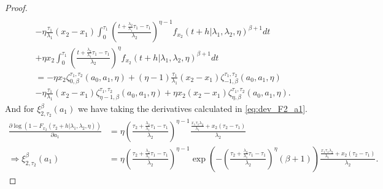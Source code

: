 \documentclass{article}
\begin{document}
\begin{proof}
\begin{align*}
\\
&-\eta\frac{\tau_1}{\lambda_1}(x_2-x_1)\int_{0}^{\tau_1}\left(\frac{t+\frac{\lambda_2}{\lambda_1}\tau_1-\tau_1}{\lambda_2}\right)^{\eta-1}f_{x_2}(t+h|\lambda_1,\lambda_2,\eta)^{\beta+1}dt 
\\
&+\eta x_2 \int_{0}^{\tau_1}\left(\frac{t+\frac{\lambda_2}{\lambda_1}\tau_1-\tau_1}{\lambda_2}\right)^{\eta}f_{x_2}(t+h|\lambda_1,\lambda_2,\eta)^{\beta+1}dt 
\\
&=-\eta x_2 \zeta_{0,\beta}^{\tau_1,\tau_2}(a_0,a_1,\eta)+(\eta-1)\frac{\tau_1}{\lambda_1}(x_2-x_1)\zeta_{-1,\beta}^{\tau_1,\tau_2}(a_0,a_1,\eta)
\\
&-\eta\frac{\tau_1}{\lambda_1}(x_2-x_1)\zeta_{\eta-1,\beta}^{\tau_1,\tau_2}(a_0,a_1,\eta)+\eta x_2(x_2-x_1)\zeta_{\eta,\beta}^{\tau_1,\tau_2}(a_0,a_1,\eta).
\end{align*}
And for $\xi_{2,\tau_2}^{\beta}(a_1)$ we have taking the derivatives calculated in \eqref{eq:dev_F2_a1}.
\begin{align*}
\frac{\partial \log\left(1-F_{x_2}(\tau_2+h|\lambda_1,\lambda_2,\eta)\right)}{\partial a_1}&=\eta\left(\frac{\tau_2+\frac{\lambda_2}{\lambda_1}\tau_1-\tau_1}{\lambda_2}\right)^{\eta-1}\frac{\frac{x_1\tau_1\lambda_2}{\lambda_1}+x_2(\tau_2-\tau_1)}{\lambda_2}
\\
\Rightarrow  \xi_{2,\tau_2}^{\beta}(a_1)&=\eta \left(\frac{\tau_2+\frac{\lambda_2}{\lambda_1}\tau_1-\tau_1}{\lambda_2}\right)^{\eta-1} \exp\left(-\left(\frac{\tau_2+\frac{\lambda_2}{\lambda_1}\tau_1-\tau_1}{\lambda_2}\right)^{\eta}(\beta+1)\right)\frac{\frac{x_1\tau_1\lambda_2}{\lambda_1}+x_2(\tau_2-\tau_1)}{\lambda_2}.
\end{align*}

\end{proof}
\end{document}
